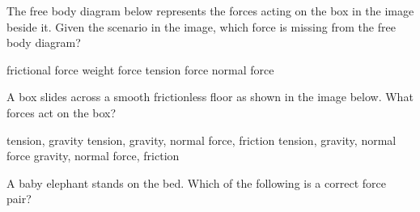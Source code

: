 \documentclass[answers]{exam}
\begin{document}
\begin{questions}

\question %
The free body diagram below represents the forces acting on the box in the image beside it. Given the scenario in the image, which force is missing from the free body diagram?

\begin{center}
\end{center}

\begin{randomizeoneparchoices}[norandomize]
    \choice frictional force
    \choice weight force
    \correctchoice tension force
    \choice normal force    
\end{randomizeoneparchoices}

\question %
A box slides across a smooth frictionless floor as shown in the image below.  What forces act on the box?

\begin{center}
\end{center}


\begin{randomizechoices}[norandomize]
    \choice tension, gravity
    \choice tension, gravity, normal force, friction
    \correctchoice tension, gravity, normal force
    \choice gravity, normal force, friction
\end{randomizechoices}

\question 
A baby elephant stands on the bed. Which of the following is a correct force pair?



\end{questions}
\end{document}
